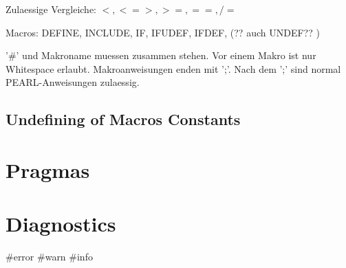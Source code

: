 Zulaessige Vergleiche: $<, <= >, >=, ==, /= $

Macros: DEFINE, INCLUDE, IF, IFUDEF, IFDEF, (?? auch UNDEF?? )

'\#' und Makroname muessen zusammen stehen. Vor einem Makro ist nur
Whitespace erlaubt. Makroanweisungen enden mit ';'.  Nach dem ';' sind
normal PEARL-Anweisungen zulaessig.

\subsection{Undefining of Macros Constants}

\section{Pragmas}

\section{Diagnostics}
\#error
\#warn
\#info




